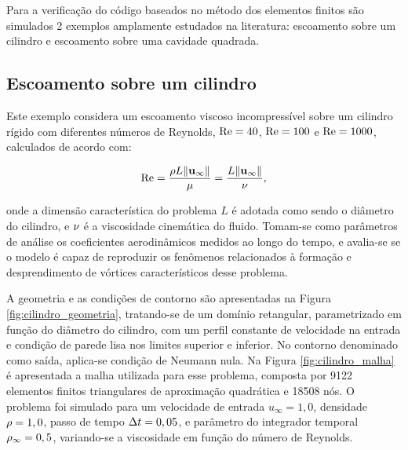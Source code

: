 Para a verificação do código baseados no método dos elementos finitos são simulados 2 exemplos amplamente estudados na literatura: escoamento sobre um cilindro e escoamento sobre uma cavidade quadrada.

\subsection{Escoamento sobre um cilindro} \label{capitulo:Cap2:VerApl:Cilindo}

Este exemplo considera um escoamento viscoso incompressível sobre um cilindro rígido com diferentes números de Reynolds, $\mathrm{Re} = 40$, $\mathrm{Re} = 100$ e $\mathrm{Re} = 1000$, calculados de acordo com:

\begin{align}
	\mathrm{Re} = \frac{\rho L \lVert\mathbf{u}_{\infty}\lVert}{\mu} = \frac{L \lVert \mathbf{u}_{\infty} \lVert}{\nu}, \label{eq:Reynolds}
\end{align}

\noindent onde a dimensão característica do problema $L$ é adotada como sendo o diâmetro do cilindro, e $\nu$ é a viscosidade cinemática do fluido. Tomam-se como parâmetros de análise os coeficientes aerodinâmicos medidos ao longo do tempo, e avalia-se se o modelo é capaz de reproduzir os fenômenos relacionados à formação e desprendimento de vórtices característicos desse problema. 

A geometria e as condições de contorno são apresentadas na Figura \ref{fig:cilindro_geometria}, tratando-se de um domínio retangular, parametrizado em função do diâmetro do cilindro, com um perfil constante de velocidade na entrada e condição de parede lisa nos limites superior e inferior. No contorno denominado como saída, aplica-se condição de Neumann nula. Na Figura \ref{fig:cilindro_malha} é apresentada a malha utilizada para esse problema, composta por 9122 elementos finitos triangulares de aproximação quadrática e 18508 nós. O problema foi simulado para um velocidade de entrada $u_{\infty} = 1,0$, densidade $\rho = 1,0$, passo de tempo $\Delta t = 0,05$, e parâmetro do integrador temporal $\rho_\infty = 0,5$, variando-se a viscosidade em função do número de Reynolds. 

